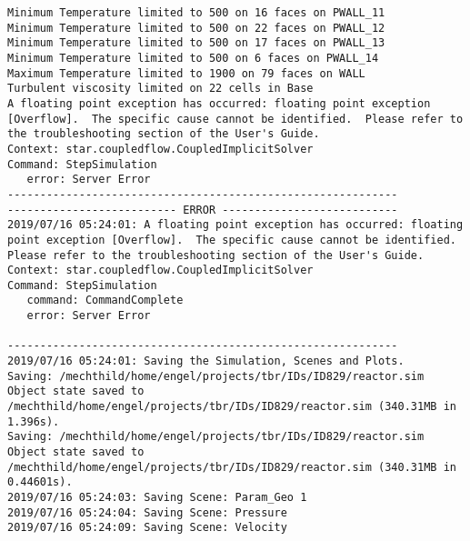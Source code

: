 \documentclass{article}
\begin{document}
{\begin{verbatim}
Minimum Temperature limited to 500 on 16 faces on PWALL_11
Minimum Temperature limited to 500 on 22 faces on PWALL_12
Minimum Temperature limited to 500 on 17 faces on PWALL_13
Minimum Temperature limited to 500 on 6 faces on PWALL_14
Maximum Temperature limited to 1900 on 79 faces on WALL
Turbulent viscosity limited on 22 cells in Base
A floating point exception has occurred: floating point exception [Overflow].  The specific cause cannot be identified.  Please refer to the troubleshooting section of the User's Guide.
Context: star.coupledflow.CoupledImplicitSolver
Command: StepSimulation
   error: Server Error
------------------------------------------------------------
-------------------------- ERROR ---------------------------
2019/07/16 05:24:01: A floating point exception has occurred: floating point exception [Overflow].  The specific cause cannot be identified.  Please refer to the troubleshooting section of the User's Guide.
Context: star.coupledflow.CoupledImplicitSolver
Command: StepSimulation
   command: CommandComplete
   error: Server Error

------------------------------------------------------------
2019/07/16 05:24:01: Saving the Simulation, Scenes and Plots.
Saving: /mechthild/home/engel/projects/tbr/IDs/ID829/reactor.sim
Object state saved to /mechthild/home/engel/projects/tbr/IDs/ID829/reactor.sim (340.31MB in 1.396s).
Saving: /mechthild/home/engel/projects/tbr/IDs/ID829/reactor.sim
Object state saved to /mechthild/home/engel/projects/tbr/IDs/ID829/reactor.sim (340.31MB in 0.44601s).
2019/07/16 05:24:03: Saving Scene: Param_Geo 1
2019/07/16 05:24:04: Saving Scene: Pressure
2019/07/16 05:24:09: Saving Scene: Velocity
\end{verbatim}
}
\clearpage
\end{document}
